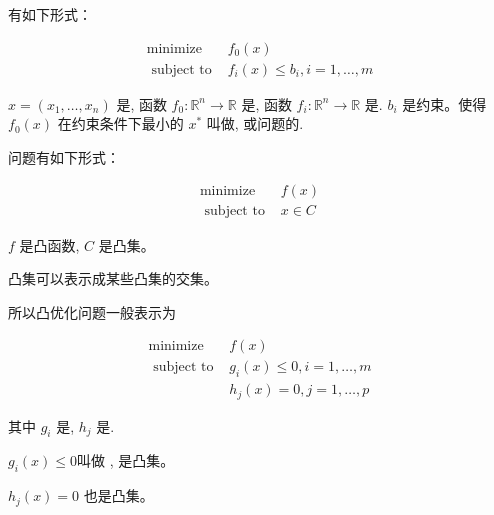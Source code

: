 \begin{definition}[优化问题]
    有如下形式：

    $$
\begin{array}{ll}
\operatorname{minimize} & f_{0}(x) \\
\text { subject to } & f_{i}(x) \leqslant b_{i}, i=1, \ldots, m
\end{array}
$$

$ x=\left(x_{1}, \ldots, x_{n}\right) $ 是, 函数 $ f_{0}: \mathbb{R}^{n} \rightarrow \mathbb{R} $ 是, 函数 $ f_{i}: \mathbb{R}^{n} \rightarrow \mathbb{R} $ 是. $ b_{i} $ 是约束。使得 $ f_{0}(x) $ 在约束条件下最小的 $ x^{*} $ 叫做, 或问题的.
\end{definition}

\begin{definition}[凸优化]
    问题有如下形式：

    $$
    \begin{array}{ll}
    \operatorname{minimize} & f(x) \\
    \text { subject to } & x \in C
    \end{array}
    $$
    
    $ f $ 是凸函数, $ C $ 是凸集。
\end{definition}

\begin{corollary}
    凸集可以表示成某些凸集的交集。
\end{corollary}

所以凸优化问题一般表示为

\begin{definition}[凸优化问题]
    \label{def:convex-problem}

    $$
    \begin{array}{ll}
    \operatorname{minimize} & f(x) \\
    \text { subject to } & g_{i}(x) \leqslant 0, i=1, \ldots, m \\
    & h_{j}(x)=0, j=1, \ldots, p
    \end{array}
    $$

    其中 $ g_{i} $ 是, $ h_{j} $ 是. 
\end{definition}

$ g_{i}(x) \leqslant 0 $叫做 , 是凸集。

\begin{theorem}
    $ h_{j}(x)=0 $ 也是凸集。
\end{theorem}

